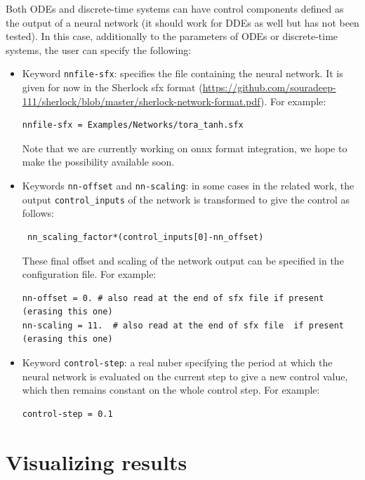 \documentclass{article}
\begin{document}
Both ODEs and discrete-time systems can have control components defined as the output of a neural network (it should work for DDEs as well but has not been tested).  In this case, additionally to the parameters of ODEs or discrete-time systems,  the user can specify the following:
\begin{itemize}
\item Keyword \texttt{nnfile-sfx}: specifies the file containing the neural network.  It is given for now in the Sherlock sfx format (\url{https://github.com/souradeep-111/sherlock/blob/master/sherlock-network-format.pdf}). 
For example:
\begin{verbatim}
nnfile-sfx = Examples/Networks/tora_tanh.sfx
\end{verbatim}
Note that we are currently working on onnx format integration, we hope to make the possibility available soon.
\item Keywords \texttt{nn-offset} and \texttt{nn-scaling}: in some cases in the related work,  the output \texttt{control\_inputs} of the network is transformed to give the control as follows:
\begin{verbatim}
 nn_scaling_factor*(control_inputs[0]-nn_offset)
\end{verbatim}
These  final offset and scaling of the network output can be specified in the configuration file.
For example:
\begin{verbatim}
nn-offset = 0. # also read at the end of sfx file if present (erasing this one)
nn-scaling = 11.  # also read at the end of sfx file  if present (erasing this one)
\end{verbatim}
\item Keyword \texttt{control-step}: a real nuber specifying the period at which the neural network is evaluated on the current step to give a new control value,  which then remains constant on the whole control step. 
For example:
\begin{verbatim}
control-step = 0.1
\end{verbatim}
\end{itemize}


\section{Visualizing results \label{visu}}
\end{document}
